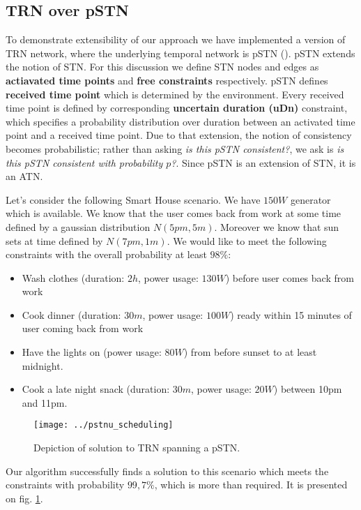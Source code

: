 \documentclass{article}
\begin{document}
\begin{multicols}{2}
\subsection{TRN over pSTN}
To demonstrate extensibility of our approach we have implemented a version of TRN network, where the underlying temporal network is pSTN (\cite{Fang2014}). pSTN extends the notion of STN. For this discussion we define STN nodes and edges as \textbf{actiavated time points} and \textbf{free constraints} respectively. pSTN defines \textbf{received time point} which is determined by the environment. Every received time point is defined by corresponding \textbf{uncertain duration (uDn)} constraint, which specifies a probability distribution over duration between an activated time point and a received time point. Due to that extension, the notion of consistency becomes probabilistic; rather than asking \textit{is this pSTN consistent?}, we ask is \textit{is this pSTN consistent with probability $p$?}. Since pSTN is an extension of STN, it is an ATN.

Let's consider the following Smart House scenario. We have $150W$ generator which is available. We know that the user comes back from work at some time defined by a gaussian distribution $N(5pm, 5m)$. Moreover we know that sun sets at time defined by $N(7pm, 1m)$. We would like to meet the following constraints with the overall probability at least $98\%$:
\begin{itemize}
\item Wash clothes (duration: $2h$, power usage: $130W$) before user comes back from work
\item Cook dinner (duration: $30m$, power usage: $100W$) ready within 15 minutes of user coming back from work
\item Have the lights on (power usage: $80W$) from before sunset to at least midnight.
\item Cook a late night snack (duration: $30m$, power usage: $20W$) between 10pm and 11pm.
\end{itemize}


\begin{figure}[H]
\begin{center}
\texttt{[image: ../pstnu\_scheduling]}
\caption{Depiction of solution to TRN spanning a pSTN.}
\label{fig:pstnu_scheduling}
\end{center}
\end{figure}

Our algorithm successfully finds a solution to this scenario which meets the constraints with probability $99,7\%$, which is more than required. It is presented on fig. \ref{fig:pstnu_scheduling}.




\end{multicols}
\end{document}
